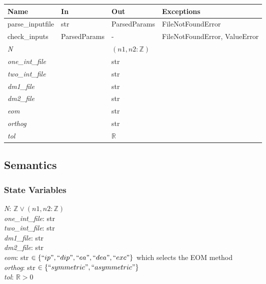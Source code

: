 \documentclass[12pt, titlepage]{article}
\begin{document}
\begin{center}
	\begin{tabular}{p{2.7cm} p{4cm} p{4cm} p{2cm}}
		\hline
		\textbf{Name} & \textbf{In} & \textbf{Out} & \textbf{Exceptions} \\
		\hline
		parse\_inputfile& str& ParsedParams & FileNotFoundError \\
		check\_inputs& ParsedParams& - & FileNotFoundError, ValueError \\
		\textit{N}& & $(n1, n2:\mathbb{Z})$ & \\
		\textit{one\_int\_file}& & str & \\
		\textit{two\_int\_file}& & str & \\
		\textit{dm1\_file}& & str & \\
		\textit{dm2\_file}& & str & \\
		\textit{eom}& & str & \\
		\textit{orthog}& & str & \\
		\textit{tol}& & $\mathbb{R}$ & \\
		\hline
	\end{tabular}
\end{center}

\subsection{Semantics}

\subsubsection{State Variables}

\textit{N}: $\mathbb{Z} \lor (n1, n2:\mathbb{Z})$\\
\textit{one\_int\_file}: str\\
\textit{two\_int\_file}: str\\
\textit{dm1\_file}: str\\
\textit{dm2\_file}: str\\
\textit{eom}: str $\in \{``ip", ``dip", ``ea", ``dea", ``exc"\}$ which selects 
the 
EOM method\\
\textit{orthog}: str $\in \{``symmetric", ``asymmetric"\}$\\
\textit{tol}: $\mathbb{R} > 0$\\
\end{document}

